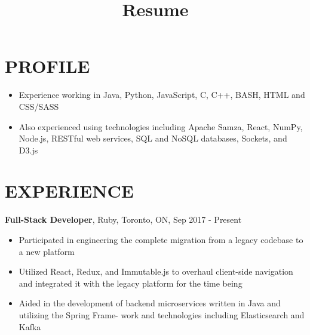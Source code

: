 \documentclass[letterpaper,11pt]{article}
\title{Resume}
\newcommand{\itemheader}[1]{\hspace*{7pt}\textbf{#1}}
\newcommand{\indentitem}{\setlength\itemindent{25pt}}
\begin{document}
  \noindent
  
  \vspace*{52pt}
  \section*{PROFILE}
	\begin{itemize}
        \item Experience working in Java, Python, JavaScript, C, C++, BASH, HTML and CSS/SASS
		\item Also experienced using technologies including Apache Samza, React, NumPy, Node.js, RESTful web services, SQL and NoSQL databases, Sockets, and D3.js
	\end{itemize}

	\section*{EXPERIENCE}
      \itemheader{Full-Stack Developer}, Ruby, Toronto, ON, Sep 2017 - Present
        \begin{itemize}
          \indentitem
          	\item Participated in engineering the complete migration from a legacy codebase to a new platform
            \item Utilized React, Redux, and Immutable.js to overhaul client-side navigation and integrated it with the \hspace*{25pt}legacy platform for the time being
            \item Aided in the development of backend microservices written in Java and utilizing the Spring Frame- \hspace*{25pt}work and technologies including Elasticsearch and Kafka
        \end{itemize}
      
\end{document}
